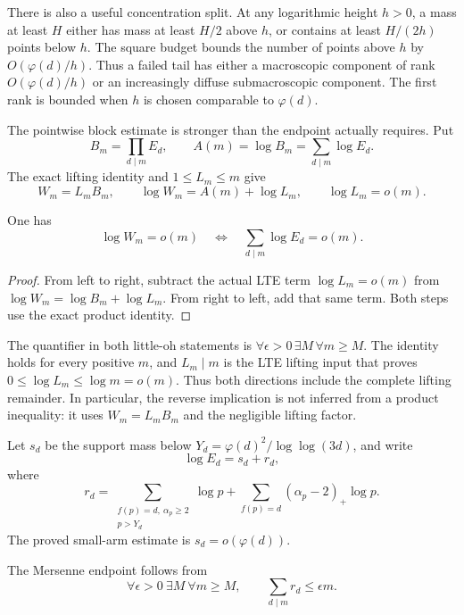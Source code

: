 There is also a useful concentration split.  At any logarithmic height
$h>0$, a mass at least $H$ either has mass at least $H/2$ above $h$, or
contains at least $H/(2h)$ points below $h$.  The square budget bounds the
number of points above $h$ by $O(\varphi(d)/h)$.  Thus a failed tail has
either a macroscopic component of rank $O(\varphi(d)/h)$ or an increasingly
diffuse submacroscopic component.  The first rank is bounded when $h$ is
chosen comparable to $\varphi(d)$.

The pointwise block estimate is stronger than the endpoint actually
requires.  Put
\[
 B_m=\prod_{d\mid m}E_d,
 \qquad
 A(m)=\log B_m=\sum_{d\mid m}\log E_d.
\]
The exact lifting identity and $1\le L_m\le m$ give
\[
 W_m=L_mB_m,
 \qquad
 \log W_m=A(m)+\log L_m,
 \qquad \log L_m=o(m).
\]

\begin{theorem}
\label{thm:mersenne-divisor-average-equivalence}
One has
\[
 \log W_m=o(m)\quad\Longleftrightarrow\quad
 \sum_{d\mid m}\log E_d=o(m).
\]
\end{theorem}

\begin{proof}
From left to right, subtract the actual LTE term
$\log L_m=o(m)$ from $\log W_m=\log B_m+\log L_m$.  From right to left,
add that same term.  Both steps use the exact product identity.
\end{proof}

The quantifier in both little-oh statements is
$\forall\epsilon>0\,\exists M\,\forall m\ge M$.  The identity holds for
every positive $m$, and $L_m\mid m$ is the LTE lifting input that proves
$0\le\log L_m\le\log m=o(m)$.  Thus both directions include the complete
lifting remainder.  In particular, the reverse implication is not inferred
from a product inequality: it uses $W_m=L_mB_m$ and the negligible lifting
factor.

Let $s_d$ be the support mass below
$Y_d=\varphi(d)^2/\log\log(3d)$, and write
\[
 \log E_d=s_d+r_d,
\]
where
\begin{equation}\label{eq:weighted-tail-remainder}
 r_d=
 \sum_{\substack{f(p)=d,\ \alpha_p\ge2\\p>Y_d}}\log p
 +\sum_{f(p)=d}(\alpha_p-2)_+\log p.
\end{equation}
The proved small-arm estimate is $s_d=o(\varphi(d))$.

\begin{corollary}
\label{cor:mersenne-divisor-average-remainder}
The Mersenne endpoint follows from
\[
 \forall\epsilon>0\ \exists M\ \forall m\ge M,
 \qquad \sum_{d\mid m}r_d\le\epsilon m.
\]
\end{corollary}

